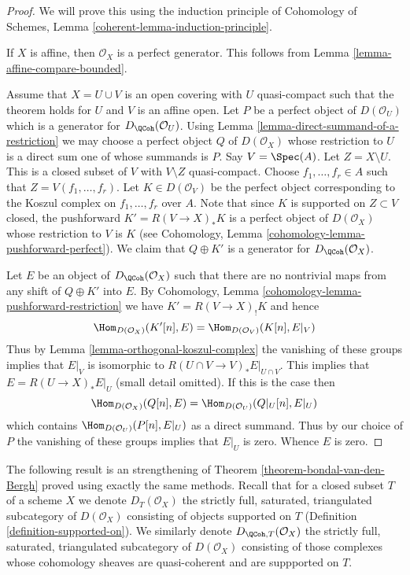 \begin{proof}
We will prove this using the induction principle of
Cohomology of Schemes, Lemma \ref{coherent-lemma-induction-principle}.

\medskip\noindent
If $X$ is affine, then $\mathcal{O}_X$ is a perfect generator.
This follows from Lemma \ref{lemma-affine-compare-bounded}.

\medskip\noindent
Assume that $X = U \cup V$ is an open covering with $U$ quasi-compact
such that the theorem holds for $U$ and $V$ is an affine open.
Let $P$ be a perfect object of $D(\mathcal{O}_U)$ which is a generator
for $D_\QCoh(\mathcal{O}_U)$. Using
Lemma \ref{lemma-direct-summand-of-a-restriction} we may
choose a perfect object
$Q$ of $D(\mathcal{O}_X)$ whose restriction to $U$ is a direct sum one
of whose summands is $P$. Say $V = \Spec(A)$. Let $Z = X \setminus U$.
This is a closed subset of $V$ with $V \setminus Z$ quasi-compact.
Choose $f_1, \ldots, f_r \in A$ such that
$Z = V(f_1, \ldots, f_r)$. Let $K \in D(\mathcal{O}_V)$ be the perfect
object corresponding to the Koszul complex on $f_1, \ldots, f_r$ over $A$.
Note that since $K$ is supported on $Z \subset V$ closed, the pushforward
$K' = R(V \to X)_*K$ is a perfect object of $D(\mathcal{O}_X)$ whose
restriction to $V$ is $K$ (see
Cohomology, Lemma \ref{cohomology-lemma-pushforward-perfect}).
We claim that $Q \oplus K'$ is a generator for
$D_\QCoh(\mathcal{O}_X)$.

\medskip\noindent
Let $E$ be an object of $D_\QCoh(\mathcal{O}_X)$ such that
there are no nontrivial maps from any shift of $Q \oplus K'$ into $E$.
By Cohomology, Lemma \ref{cohomology-lemma-pushforward-restriction}
we have $K' =  R(V \to X)_! K$ and hence
$$
\Hom_{D(\mathcal{O}_X)}(K'[n], E) = \Hom_{D(\mathcal{O}_V)}(K[n], E|_V)
$$
Thus by Lemma \ref{lemma-orthogonal-koszul-complex} the vanishing of
these groups implies that $E|_V$ is isomorphic to
$R(U \cap V \to V)_*E|_{U \cap V}$. This implies that $E = R(U \to X)_*E|_U$
(small detail omitted). If this is the case then
$$
\Hom_{D(\mathcal{O}_X)}(Q[n], E) = \Hom_{D(\mathcal{O}_U)}(Q|_U[n], E|_U)
$$
which contains $\Hom_{D(\mathcal{O}_U)}(P[n], E|_U)$ as a direct summand.
Thus by our choice of $P$ the vanishing of these groups implies that $E|_U$
is zero. Whence $E$ is zero.
\end{proof}

\noindent
The following result is an strengthening of
Theorem \ref{theorem-bondal-van-den-Bergh}
proved using exactly the same methods.
Recall that for a closed subset $T$ of a scheme $X$ we denote
$D_T(\mathcal{O}_X)$ the strictly full, saturated,
triangulated subcategory of $D(\mathcal{O}_X)$ consisting of objects
supported on $T$ (Definition \ref{definition-supported-on}).
We similarly denote $D_{\QCoh, T}(\mathcal{O}_X)$ the strictly full, saturated,
triangulated subcategory of $D(\mathcal{O}_X)$ consisting of those
complexes whose cohomology sheaves are quasi-coherent and are suppported
on $T$.

